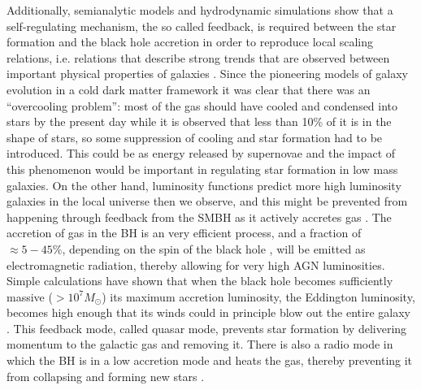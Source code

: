 Additionally, semianalytic models and hydrodynamic simulations show that a self-regulating mechanism, the so called feedback, is required between the star formation and the black hole accretion in order to reproduce local scaling relations, i.e. relations that describe strong trends that are observed between important physical properties of galaxies %
\citep[see][for a review]{2015ARA&A..53...51S}. Since the pioneering models of galaxy evolution in a cold dark matter framework it was clear that there was an ``overcooling problem'': most of the gas should have cooled and condensed into stars by the present day while it is observed that less than 10\% of it is in the shape of stars, so some suppression of cooling and star formation had to be introduced. This could be as energy released by supernovae \citep{1974MNRAS.169..229L,1978MNRAS.183..341W,1986ApJ...303...39D,1991ApJ...379...52W} and the impact of this phenomenon would be important in regulating star formation in low mass galaxies. On the other hand, luminosity functions predict more high luminosity galaxies in the local universe then we observe, and this might be prevented from happening through feedback from the SMBH as it actively accretes gas%
.%
The accretion of gas in the BH is an very efficient process, and a fraction of $\approx 5-45\%$, depending on the spin of the black hole \citep[e.g.][]{1963PhRvL..11..237K,1983bhwd.book.....S}, will be emitted as electromagnetic radiation, thereby allowing for very high AGN luminosities.
Simple calculations have shown that when the black hole becomes sufficiently massive ($> 10^7 M_\odot$) its maximum accretion luminosity, the Eddington %
luminosity, becomes high enough that its winds could in principle blow out the entire galaxy %
\citep{1998A&A...331L...1S}. This feedback mode, called quasar mode, prevents star formation by delivering momentum to the galactic gas and removing it. There is also a radio mode in which the BH is in a low accretion mode and heats the gas, thereby preventing it from collapsing and forming new stars \citep{2017NatAs...1E.165H}.
     
